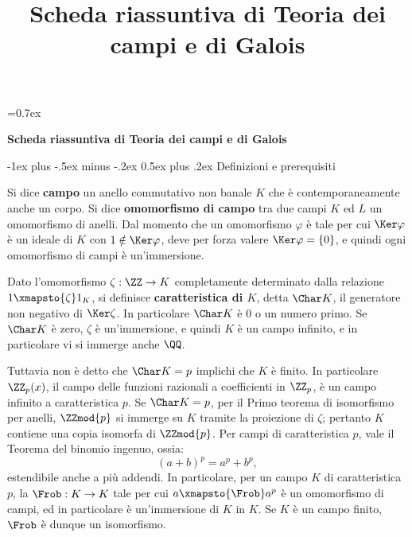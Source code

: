 \documentclass[10pt,landscape]{article}
\title{Scheda riassuntiva di Teoria dei campi e di Galois}
\makeatletter
\renewcommand{\section}{\@startsection{section}{1}{0mm}%
	{-1ex plus -.5ex minus -.2ex}%
	{0.5ex plus .2ex}%
	{\normalfont\large\bfseries}}
\makeatother
\begin{document}
	
	\parskip=0.7ex
	
	\raggedright
	\footnotesize
	
	\begin{center}
		\Large{\textbf{Scheda riassuntiva di Teoria dei campi e di Galois}} \\
	\end{center}
	\begin{multicols}{3}
		\setlength{\premulticols}{1pt}
		\setlength{\postmulticols}{1pt}
		\setlength{\multicolsep}{1pt}
		\setlength{\columnsep}{2pt}
		
		\section{Definizioni e prerequisiti}
		
		Si dice \textbf{campo} un anello commutativo non banale
		$K$ che è
		contemporaneamente anche un corpo. Si dice
		\textbf{omomorfismo di campo} tra due campi $K$ ed $L$
		un omomorfismo di anelli. Dal momento che un omomorfismo
		$\varphi$ è tale per cui $\Ker \varphi$ è un ideale
		di $K$ con $1 \notin \Ker \varphi$, deve per forza
		valere $\Ker \varphi = \{0\}$, e quindi ogni omomorfismo
		di campi è un'immersione. \medskip
		
		
		Dato l'omomorfismo $\zeta : \ZZ \to K$ completamente
		determinato dalla relazione $1 \xmapsto{\zeta} 1_K$,
		si definisce \textbf{caratteristica di $K$}, detta
		$\Char K$, il
		generatore non negativo di $\Ker \zeta$. In particolare
		$\Char K$ è $0$ o un numero primo. Se $\Char K$ è zero,
		$\zeta$ è un'immersione, e quindi $K$ è un campo infinito,
		e in particolare vi si immerge anche $\QQ$. \medskip
		
		
		Tuttavia non è detto che $\Char K = p$ implichi che $K$ è
		finito. In particolare $\ZZ_p(x)$, il campo delle funzioni
		razionali a coefficienti in $\ZZ_p$, è un campo infinito
		a caratteristica $p$. Se $\Char K = p$, per il Primo
		teorema di isomorfismo per anelli, $\ZZmod{p}$ si immerge
		su $K$ tramite la proiezione di $\zeta$; pertanto
		$K$ contiene una copia isomorfa di $\ZZmod{p}$. Per
		campi di caratteristica $p$, vale il Teorema del
		binomio ingenuo, ossia:
		\[ (a + b)^p = a^p + b^p, \]
		estendibile anche a più addendi.
		In particolare, per un campo $K$ di caratteristica $p$,
		la $\Frob : K \to K$ tale per cui $a \xmapsto{\Frob} a^p$
		è un omomorfismo di campi, ed in particolare è un'immersione
		di $K$ in $K$. Se $K$ è un campo finito, $\Frob$ è dunque
		un isomorfismo.
		

\end{multicols}
\end{document}
